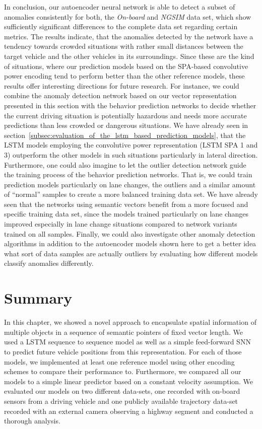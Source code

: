 In conclusion, our autoencoder neural network is able to detect a subset of anomalies consistently for both, the \emph{On-board} and \emph{\ac{NGSIM}} data set, which show sufficiently significant differences to the complete data set regarding certain metrics.
The results indicate, that the anomalies detected by the network have a tendency towards crowded situations with rather small distances between the target vehicle and the other vehicles in its surroundings.
Since these are the kind of situations, where our prediction models based on the \ac{SPA}-based convolutive power encoding tend to perform better than the other reference models, these results offer interesting directions for future research.
For instance, we could combine the anomaly detection network based on our vector representation presented in this section with the behavior prediction networks to decide whether the current driving situation is potentially hazardous and needs more accurate predictions than less crowded or dangerous situations. 
We have already seen in section~\ref{subsec:evaluation_of_the_lstm_based_prediction_models}, that the \ac{LSTM} models employing the convolutive power representation (\ac{LSTM} \ac{SPA} \num{1} and \num{3}) outperform the other models in such situations particularly in lateral direction. 
Furthermore, one could also imagine to let the outlier detection network guide the training process of the behavior prediction networks.
That is, we could train prediction models particularly on lane changes, the outliers and a similar amount of \enquote{normal} samples to create a more balanced training data set.
We have already seen that the networks using semantic vectors benefit from a more focused and specific training data set, since the models trained particularly on lane changes improved especially in lane change situations compared to network variants trained on all samples.
Finally, we could also investigate other anomaly detection algorithms in addition to the autoencoder models shown here to get a better idea what sort of data samples are actually  outliers by evaluating how different models classify anomalies differently.

\section{Summary}%
\label{sec:summary_behavior_prediction}

In this chapter, we showed a novel approach to encapsulate spatial information of multiple objects in a sequence of semantic pointers of fixed vector length.
We used a \ac{LSTM} sequence to sequence model as well as a simple feed-forward \acl{SNN} to predict future vehicle positions from this representation.
For each of those models, we implemented at least one reference model using other encoding schemes to compare their performance to.
Furthermore, we compared all our models to a simple linear predictor based on a constant velocity assumption.
We evaluated our models on two different data-sets, one recorded with on-board sensors from a driving vehicle and one publicly available trajectory data-set recorded with an external camera observing a highway segment and conducted a thorough analysis.

